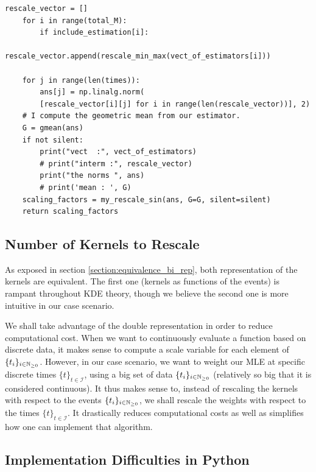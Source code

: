 \documentclass[11pt]{book}
\newcommand{\sequence}[1]{\{ #1 \}_{ i \in \N} }
\newcommand{\sequencetime}{\{t\}_{t \in \mathcal I} }
\begin{document}
\begin{Verbatim}[fontsize=\footnotesize]
    rescale_vector = []
    for i in range(total_M):
        if include_estimation[i]:
            rescale_vector.append(rescale_min_max(vect_of_estimators[i]))

    for j in range(len(times)):
        ans[j] = np.linalg.norm(
        [rescale_vector[i][j] for i in range(len(rescale_vector))], 2)
    # I compute the geometric mean from our estimator.
    G = gmean(ans)
    if not silent:
        print("vect  :", vect_of_estimators)
        # print("interm :", rescale_vector)
        print("the norms ", ans)
        # print('mean : ', G)
    scaling_factors = my_rescale_sin(ans, G=G, silent=silent)
    return scaling_factors
\end{Verbatim}

\subsection{Number of Kernels to Rescale}
As exposed in section \ref{section:equivalence_bi_rep}, both representation of the kernels are equivalent. The first one (kernels as functions of the events) is rampant throughout KDE theory, though we believe the second one is more intuitive in our case scenario.

We shall take advantage of the double representation in order to reduce computational cost. When we want to continuously evaluate a function based on discrete data, it makes sense to compute a scale variable for each element of $\sequence{t_i}$. However, in our case scenario, we want to weight our MLE at specific discrete times $\sequencetime$, using a big set of data $\sequence{t_i}$ (relatively so big that it is considered continuous). It thus makes sense to, instead of rescaling the kernels with respect to the events $\sequence{t_i}$, we shall rescale the weights with respect to the times $\sequencetime$. It drastically reduces computational costs as well as simplifies how one can implement that algorithm.




\subsection{Implementation Difficulties in Python}

\end{document}
